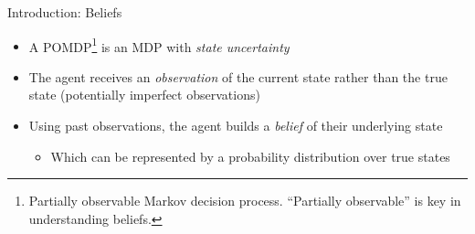 \begin{frame}[fragile]{Introduction: Beliefs}

\begin{itemize}
    \item A POMDP\footnote{Partially observable Markov decision process. ``Partially observable'' is key in understanding beliefs.} is an MDP with \textit{state uncertainty}
    \item The agent receives an \textit{observation} of the current state rather than the true state (potentially imperfect observations)
    \item Using past observations, the agent builds a \textit{belief} of their underlying state
    \begin{itemize}
        \item Which can be represented by a probability distribution over true states
    \end{itemize}
\end{itemize}

\end{frame}